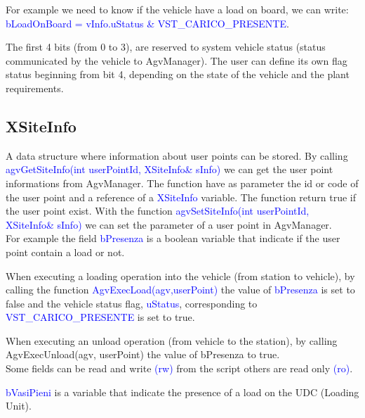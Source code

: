 For example we need to know if the vehicle have a load on board, we can write:
\textcolor{blue}{bLoadOnBoard = vInfo.uStatus  \&  VST\_CARICO\_PRESENTE}.

The first 4 bits (from 0 to 3), are reserved to system vehicle status (status communicated by the vehicle to AgvManager).
The user can define its own flag status beginning from bit 4, depending on the state of the vehicle and the plant requirements.\\

%
\subsection{XSiteInfo}
A data structure where information about user points can be stored.
By calling \textcolor{blue}{agvGetSiteInfo(int userPointId, XSiteInfo\& sInfo)} we can get the user point informations from AgvManager. The function have as parameter the id or code of the user point and a reference of a \textcolor{blue}{XSiteInfo} variable.
The function return true if the user point exist.
With the function \textcolor{blue}{agvSetSiteInfo(int userPointId, XSiteInfo\& sInfo)} we can set the parameter of a user point in AgvManager.\\

For example the field \textcolor{blue}{bPresenza} is a boolean variable that indicate if the user point contain a load or not.

When executing a loading operation into the vehicle (from station to vehicle), by calling the function \textcolor{blue}{AgvExecLoad(agv,userPoint)} the value of \textcolor{blue}{bPresenza} is set to false and the vehicle status flag, \textcolor{blue}{uStatus}, corresponding to \textcolor{blue}{VST\_CARICO\_PRESENTE} is set to true.

When executing an unload operation (from vehicle to the station), by calling {AgvExecUnload(agv, userPoint)} the value of {bPresenza} to true.\\

Some fields can be read and write \textcolor{blue}{(rw)} from the script others are read only \textcolor{blue}{(ro)}.

\textcolor{blue}{bVasiPieni} is a variable that indicate the presence of a load on the UDC (Loading Unit).

%
